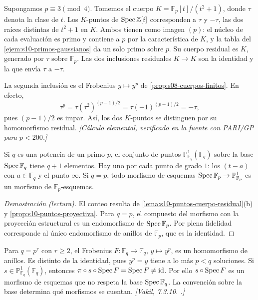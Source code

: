 \begin{obs}
\label{obs:s10-dos-puntos-gaussianos}
Supongamos \(p\equiv3\pmod4\). Tomemos el cuerpo \(K=\mathbb F_p[t]/(t^2+1)\), donde \(\tau\) denota la clase de \(t\). Los \(K\)-puntos de \(\operatorname{Spec}\mathbb Z[i]\) corresponden a \(\tau\) y \(-\tau\), las dos raíces distintas de \(t^2+1\) en \(K\). Ambos tienen como imagen \((p)\): el núcleo de cada evaluación es primo y contiene a \(p\) por la característica de \(K\), y la tabla del \cref{ejem:s10-primos-gaussianos} da un solo primo sobre \(p\). Su cuerpo residual es \(K\), generado por \(\tau\) sobre \(\mathbb F_p\). Las dos inclusiones residuales \(K\to K\) son la identidad y la que envía \(\tau\) a \(-\tau\).

La segunda inclusión es el Frobenius \(y\mapsto y^p\) de \cref{prop:s08-cuerpos-finitos}. En efecto,
\[
 \tau^p=\tau(\tau^2)^{(p-1)/2}=\tau(-1)^{(p-1)/2}=-\tau,
\]
pues \((p-1)/2\) es impar. Así, los dos \(K\)-puntos se distinguen por su homomorfismo residual. \emph{[Cálculo elemental, verificado en la fuente con PARI/GP para \(p<200\).]}
\end{obs}

\begin{prop}
\label{prop:s10-proyectiva-fq}
Si \(q\) es una potencia de un primo \(p\), el conjunto de puntos \(\mathbb P^1_{\mathbb F_q}(\mathbb F_q)\) sobre la base \(\operatorname{Spec}\mathbb F_q\) tiene \(q+1\) elementos. Hay uno por cada punto de grado \(1\): los \((t-a)\) con \(a\in\mathbb F_q\) y el punto \(\infty\). Si \(q=p\), todo morfismo de esquemas \(\operatorname{Spec}\mathbb F_p\to\mathbb P^1_{\mathbb F_p}\) es un morfismo de \(\mathbb F_p\)-esquemas.
\end{prop}
\begin{proof}[Demostración (lectura)]
El conteo resulta de \cref{lema:s10-puntos-cuerpo-residual}(b) y \cref{prop:s10-puntos-proyectiva}. Para \(q=p\), el compuesto del morfismo con la proyección estructural es un endomorfismo de \(\operatorname{Spec}\mathbb F_p\). Por plena fidelidad corresponde al único endomorfismo de anillos de \(\mathbb F_p\), que es la identidad.
\end{proof}

\begin{obs}
\label{obs:s10-frobenius-no-relativo}
Para \(q=p^r\) con \(r\ge2\), el Frobenius \(F\colon\mathbb F_q\to\mathbb F_q\), \(y\mapsto y^p\), es un homomorfismo de anillos. Es distinto de la identidad, pues \(y^p=y\) tiene a lo más \(p<q\) soluciones. Si \(s\in\mathbb P^1_{\mathbb F_q}(\mathbb F_q)\), entonces \(\pi\circ s\circ\operatorname{Spec} F=\operatorname{Spec} F\ne\operatorname{id}\). Por ello \(s\circ\operatorname{Spec} F\) es un morfismo de esquemas que no respeta la base \(\operatorname{Spec}\mathbb F_q\). La convención sobre la base determina qué morfismos se cuentan. \emph{[Vakil, 7.3.10. .]}
\end{obs}


